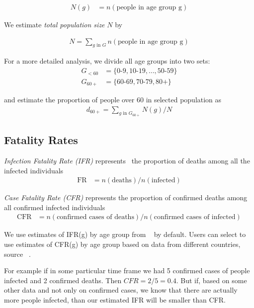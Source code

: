 \documentclass[12pt]{article}
\begin{document}
\begin{align*}
N(g) &=
  n(\text{people in age group g})
\end{align*}

We estimate {\it total population size} $N$ by

\begin{align*}
N = \sum_{g \text{ in } G}
  n(\text{people in age group g})
\end{align*}

For a more detailed analysis, we divide all age groups into two sets:
\begin{align*}
G_{<60} &=
  \{ \text{0-9}, \text{10-19}, \ldots, \text{50-59} \} \\
G_{60+} &=
  \{ \text{60-69}, \text{70-79}, \text{80+} \}
\end{align*}

and estimate the proportion of people over 60 in selected population as
\begin{align*}
d_{60+} = \sum_{g \text{ in } G_{60+}} N(g) / N
\end{align*}

\subsection*{Fatality Rates}
{\it Infection Fatality Rate (IFR)} represents~\cite{cfr_wiki} the proportion of deaths among all the infected individuals
\begin{align*}
\text{FR} &=
  n(\text{deaths}) /
  n(\text{infected})
\end{align*}

{\it Case Fatality Rate (CFR)} represents the proportion of confirmed deaths among all confirmed infected individuals
\begin{align*}
\text{CFR} &=
 n( \text{confirmed cases of deaths} ) /
 n( \text{confirmed cases of infected} )
\end{align*}

We use estimates of IFR(g) by age group from ~\cite{imperial} by default. Users can select to use estimates of CFR(g) by age group based on data from different countries, source ~\cite{cfrs}.

For example if in some particular time frame we had 5 confirmed cases of people infected and 2 confirmed deaths. Then $CFR = 2/5 = 0.4$. But if, based on some other data and not only on confirmed cases, we know that there are actually more people infected, than our estimated IFR will be smaller than CFR.
\end{document}
